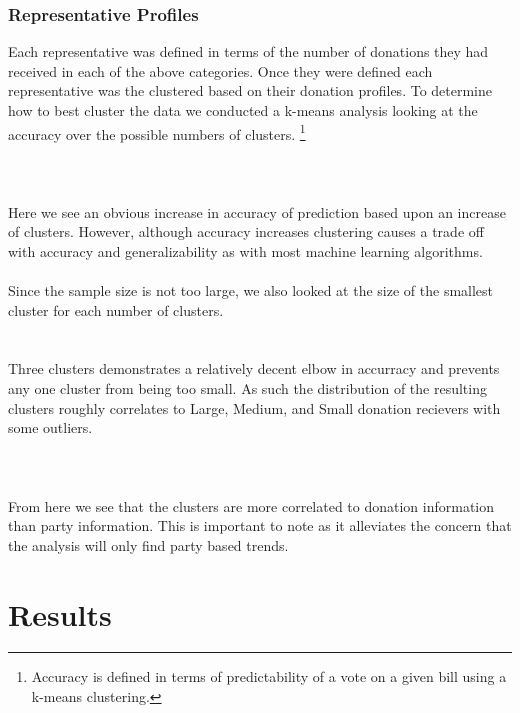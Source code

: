 \documentclass[journal]{IEEEtran}
\begin{document}
\subsubsection{Representative Profiles}
Each representative was defined in terms of the number of donations they had received in each of the above
categories. Once they were defined each representative was the clustered based on their donation profiles.
To determine how to best cluster the data we conducted a k-means analysis looking at the accuracy over the 
possible numbers of clusters.
\footnote{Accuracy is defined in terms of predictability of a vote on a given bill using a k-means clustering.}\\\\
\\
\\Here we see an obvious increase in accuracy of prediction based upon an increase of clusters. However, although accuracy increases
clustering causes a trade off with accuracy and generalizability as with most machine learning algorithms.\\\\
Since the sample size is not too large, we also looked at the size of the smallest cluster for each number of clusters.\\
\\

\\Three clusters demonstrates a relatively decent elbow in accurracy and prevents any one cluster from being too small. As such
the distribution of the resulting clusters roughly correlates to Large, Medium, and Small donation recievers with some outliers.\\\\
\\\\
From here we see that the clusters are more correlated to donation information than party information. This is important to note
as it alleviates the concern that the analysis will only find party based trends.
\section{Results}
\end{document}

